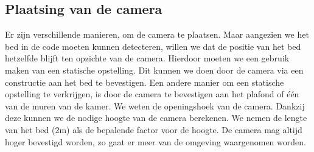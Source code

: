 \subsection {Plaatsing van de camera}
\label{mRefSTP}
Er zijn verschillende manieren, om de camera te plaatsen. Maar aangezien we het bed in de code moeten kunnen detecteren, willen we dat de positie van het bed hetzelfde blijft ten opzichte van de camera. Hierdoor moeten we een gebruik maken van een statische opstelling. Dit kunnen we doen door de camera via een constructie aan het bed te bevestigen. Een andere manier om een statische opstelling te verkrijgen, is door de camera te bevestigen aan het plafond of \'e\'en van de muren van de kamer.  We weten de openingshoek van de camera. Dankzij deze kunnen we de nodige hoogte van de camera berekenen. We nemen de lengte van het bed (2m) als de bepalende factor voor de hoogte. De camera mag altijd hoger bevestigd worden, zo gaat er meer van de omgeving waargenomen worden. 

